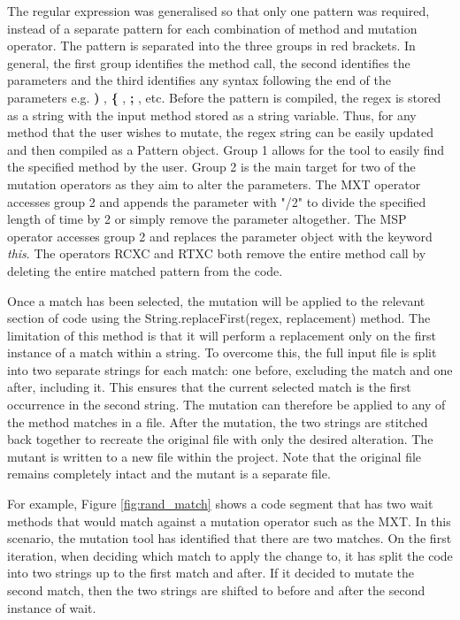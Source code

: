 \documentclass[a4paper,12pt]{article}
\begin{document}
The regular expression was generalised so that only one pattern was required, instead of a separate pattern for each combination of method and mutation operator. The pattern is separated into the three groups in red brackets. In general, the first group identifies the method call, the second identifies the parameters and the third identifies any syntax following the end of the parameters e.g. \textbf{)} , \textbf{\{} , \textbf{;} , etc. Before the pattern is compiled, the regex is stored as a string with the input method stored as a string variable. Thus, for any method that the user wishes to mutate, the regex string can be easily updated and then compiled as a Pattern object. Group 1 allows for the tool to easily find the specified method by the user. Group 2 is the main target for two of the mutation operators as they aim to alter the parameters. The MXT operator accesses group 2 and appends the parameter with "/2" to divide the specified length of time by 2 or simply remove the parameter altogether. The MSP operator accesses group 2 and replaces the parameter object with the keyword \textit{this}. The operators RCXC and RTXC both remove the entire method call by deleting the entire matched pattern from the code.       

Once a match has been selected, the mutation will be applied to the relevant section of code using the String.replaceFirst(regex, replacement) method. The limitation of this method is that it will perform a replacement only on the first instance of a match within a string. To overcome this, the full input file is split into two separate strings for each match: one before, excluding the match and one after, including it. This ensures that the current selected match is the first occurrence in the second string. The mutation can therefore be applied to any of the method matches in a file. After the mutation, the two strings are stitched back together to recreate the original file with only the desired alteration. The mutant is written to a new file within the project. Note that the original file remains completely intact and the mutant is a separate file.

For example, Figure \ref{fig:rand_match} shows a code segment that has two wait methods that would match against a mutation operator such as the MXT. In this scenario, the mutation tool has identified that there are two matches. On the first iteration, when deciding which match to apply the change to, it has split the code into two strings up to the first match and after. If it decided to mutate the second match, then the two strings are shifted to before and after the second instance of wait. 
\end{document}

